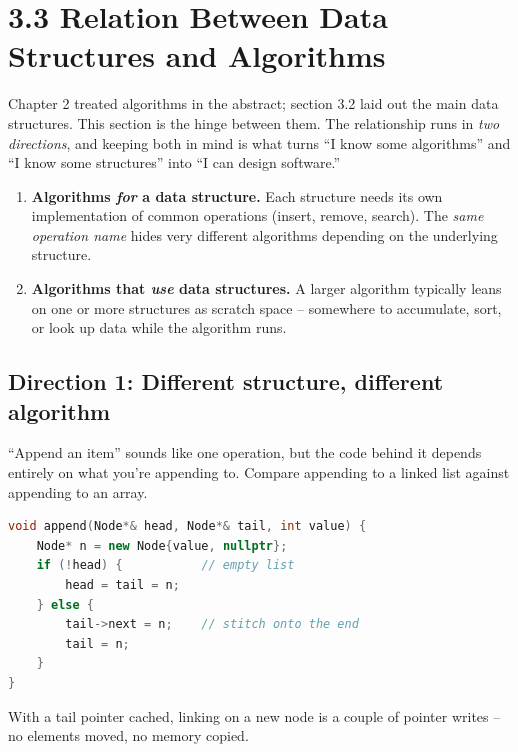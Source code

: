 \documentclass[11pt]{article}
\begin{document}
\section{3.3 Relation Between Data Structures and Algorithms}

Chapter 2 treated algorithms in the abstract; section 3.2 laid out the
main data structures. This section is the hinge between them. The
relationship runs in \emph{two directions}, and keeping both in mind
is what turns ``I know some algorithms'' and ``I know some
structures'' into ``I can design software.''

\begin{ideabox}
\begin{enumerate}[leftmargin=*]
  \item \textbf{Algorithms \emph{for} a data structure.} Each structure
        needs its own implementation of common operations (insert,
        remove, search). The \emph{same operation name} hides very
        different algorithms depending on the underlying structure.
  \item \textbf{Algorithms that \emph{use} data structures.} A
        larger algorithm typically leans on one or more structures as
        scratch space -- somewhere to accumulate, sort, or look up
        data while the algorithm runs.
\end{enumerate}
\end{ideabox}

\subsection{Direction 1: Different structure, different algorithm}

``Append an item'' sounds like one operation, but the code behind it
depends entirely on what you're appending to. Compare appending to a
linked list against appending to an array.

\begin{examplebox}
\begin{lstlisting}[basicstyle=\ttfamily\small,frame=single,language=C++]
void append(Node*& head, Node*& tail, int value) {
    Node* n = new Node{value, nullptr};
    if (!head) {           // empty list
        head = tail = n;
    } else {
        tail->next = n;    // stitch onto the end
        tail = n;
    }
}
\end{lstlisting}
With a tail pointer cached, linking on a new node is a couple of
pointer writes -- no elements moved, no memory copied.
\end{examplebox}
\end{document}
